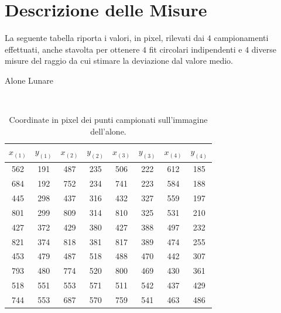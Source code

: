 \documentclass{report}[a4paper,11pt]
\begin{document}
\section{Descrizione delle Misure}
La seguente tabella riporta i valori, in pixel, rilevati dai $4$ campionamenti effettuati, anche stavolta per ottenere $4$ fit circolari indipendenti e $4$ diverse misure del raggio da cui stimare la deviazione dal valore medio.
\begin{table}[htb!]
  \begin{center}
  \begin{large}
  Alone Lunare
  \end{large}\\
	\begin{tabular}{cccccccc}
	\toprule
	$x_{(1)}$  & $y_{(1)}$  & $x_{(2)}$  & $y_{(2)}$  & $x_{(3)}$  & $y_{(3)}$ & $x_{(4)}$  & $y_{(4)}$ \\
	\midrule
	\midrule
	562 & 191 & 487 & 235 & 506 & 222 & 612 & 185 \\
	                                         
	684 & 192 & 752 & 234 & 741 & 223 & 584 & 188 \\
	                                         
	445 & 298 & 437 & 316 & 432 & 327 & 559 & 197 \\
	                                         
	801 & 299 & 809 & 314 & 810 & 325 & 531 & 210 \\
	                                         
	427 & 372 & 429 & 380 & 427 & 388 & 497 & 232 \\
	                                         
	821 & 374 & 818 & 381 & 817 & 389 & 474 & 255 \\
	                                         
	453 & 479 & 487 & 518 & 488 & 470 & 442 & 307 \\
	                                         
	793 & 480 & 774 & 520 & 800 & 469 & 430 & 361 \\
	                                         
	518 & 551 & 553 & 571 & 511 & 542 & 437 & 429 \\
	                                         
	744 & 553 & 687 & 570 & 759 & 541 & 463 & 486 \\
	\bottomrule
	\end{tabular}
  \end{center}
  \caption{Coordinate in pixel dei punti campionati sull'immagine dell'alone.}
\end{table}
\end{document}
